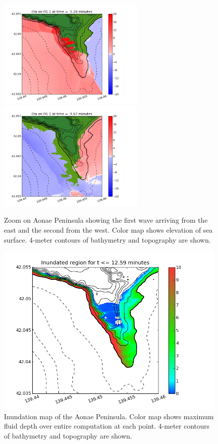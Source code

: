 \begin{figure}[ht]
\hfil\includegraphics[width=2.8in]{bp9/aonae_5.png}\hfil
\hfil\includegraphics[width=2.8in]{bp9/aonae_14.png}\hfil
\caption{\label{bp9aonae}
Zoom on Aonae Peninsula showing the first wave arriving from the east and the second from the west.  Color map shows elevation of sea surface.  4-meter contours of bathymetry and topography are shown.
  }
\end{figure}

\begin{figure}[ht]
\hfil\includegraphics[width=5.0in]{bp9/in_aonae.png}\hfil
\caption{\label{bp9inaonae}
Inundation map of the Aonae Peninsula.  Color map shows maximum fluid depth over entire computation at each point. 4-meter contours of bathymetry and topography are shown. 
  }
\end{figure}

